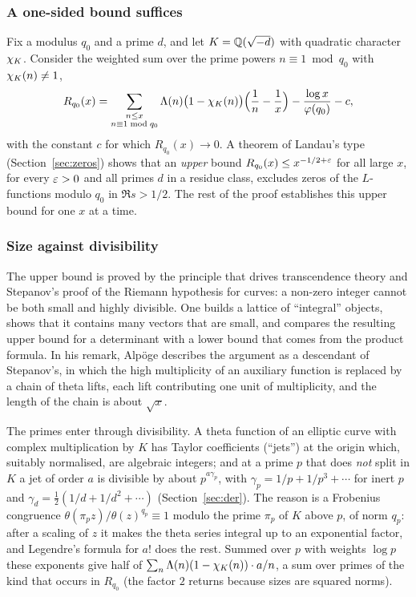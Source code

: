 \subsubsection*{A one-sided bound suffices}
Fix a modulus $q_0$ and a prime $d$, and let $K = \mathbb{Q}(\sqrt{-d})$ with quadratic character
$\chi_K$. Consider the weighted sum over the prime powers $n \equiv 1 \bmod q_0$ with
$\chi_K(n) \ne 1$,
\[
  R_{q_0}(x) = \sum_{\substack{n \le x \\ n \equiv 1 \bmod q_0}}
     \Lambda(n)\bigl(1 - \chi_K(n)\bigr)\Bigl(\frac1n - \frac1x\Bigr) - \frac{\log x}{\varphi(q_0)} - c ,
\]
with the constant $c$ for which $R_{q_0}(x) \to 0$. A theorem of Landau's type
(Section~\ref{sec:zeros}) shows that an \emph{upper} bound $R_{q_0}(x) \le x^{-1/2+\varepsilon}$ for all
large $x$, for every $\varepsilon > 0$ and all primes $d$ in a residue class, excludes zeros of the
$L$-functions modulo $q_0$ in $\Re s > 1/2$. The rest of the proof establishes this upper bound for one $x$ at a time.

\subsubsection*{Size against divisibility}
The upper bound is proved by the principle that drives transcendence theory and Stepanov's proof
of the Riemann hypothesis for curves: a non-zero integer cannot be both small and highly
divisible. One builds a lattice of ``integral'' objects, shows that it contains many vectors that
are small, and compares the resulting upper bound for a determinant with a lower bound that comes
from the product formula. In his remark, Alp\"oge describes the argument as a descendant of
Stepanov's, in which the high multiplicity of an auxiliary function is replaced by a chain of
theta lifts, each lift contributing one unit of multiplicity, and the length of the chain is about
$\sqrt{x}$.

The primes enter through divisibility. A theta function of an elliptic curve with complex
multiplication by $K$ has Taylor coefficients (``jets'') at the origin which, suitably
normalised, are algebraic integers; and at a prime $p$ that does \emph{not} split in $K$ a jet of
order $a$ is divisible by about $p^{a\gamma_p}$, with $\gamma_p = 1/p + 1/p^3 + \cdots$ for inert
$p$ and $\gamma_d = \frac12(1/d + 1/d^2 + \cdots)$ (Section~\ref{sec:der}). The reason is a
Frobenius congruence $\theta(\pi_p z)/\theta(z)^{q_p} \equiv 1$ modulo the prime $\pi_p$ of $K$
above $p$, of norm $q_p$: after a scaling of $z$ it makes the theta series integral up to an
exponential factor, and Legendre's formula for $a!$ does the rest. Summed over $p$ with weights
$\log p$ these exponents give half of $\sum_n \Lambda(n)(1 - \chi_K(n))\cdot a/n$, a sum over
primes of the kind that occurs in $R_{q_0}$ (the factor $2$ returns because sizes are squared
norms).

